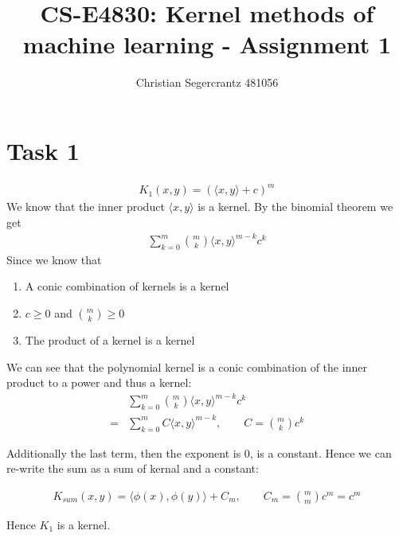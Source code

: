 \documentclass{article}
\title{CS-E4830: Kernel methods of machine learning - Assignment 1}
\author{Christian Segercrantz 481056}
\begin{document}
	\maketitle
	\pagebreak
\section*{Task 1}
\begin{align}
	K_1(x,y) = (\langle x,y \rangle+c)^m
\end{align}
We know that the inner product $\langle x,y \rangle$ is a kernel. By the binomial theorem we get 
\begin{align}
	\sum_{k=0}^{m} {m \choose k} \langle x,y \rangle^{m-k}c^k
\end{align}
Since we know that 
\begin{enumerate}
	\item A conic combination of kernels is a kernel
	\item $c\geq 0$ and ${m \choose k} \geq 0$
	\item The product of a kernel is a kernel
\end{enumerate}
We can see that the polynomial kernel is a conic combination of the inner product to a power and thus a kernel: 
\begin{align}
	&\sum_{k=0}^{m} {m \choose k} \langle x,y \rangle^{m-k}c^k \\
	=& \sum_{k=0}^{m} C \langle x,y \rangle^{m-k}, \qquad C= {m \choose k}c^k 
\end{align}

Additionally the last term, then the exponent is 0, is a constant. Hence we can re-write the sum as a sum of kernal and a constant:

\begin{align}
	K_{sum}(x,y) = \langle\phi(x),\phi(y) \rangle + C_m, \qquad C_m = {m \choose m} c^m = c^m
\end{align}

Hence $K_1$ is a kernel.
\end{document}
